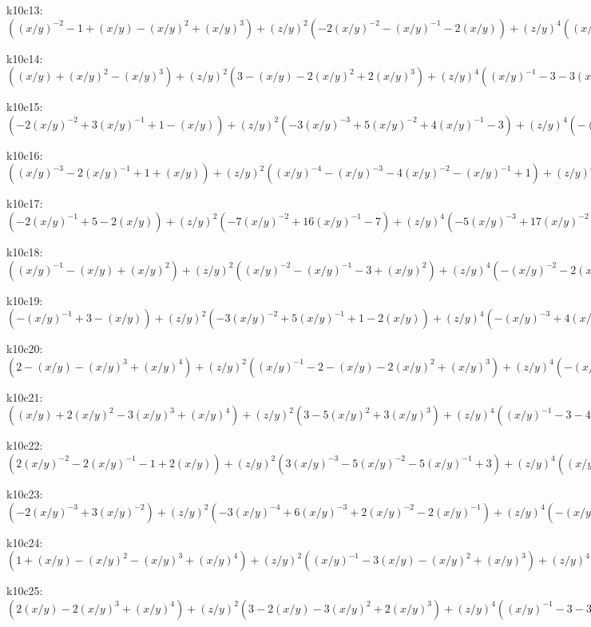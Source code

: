 k10c13: $ ((x/y)^{-2}-1+(x/y)-(x/y)^{2}+(x/y)^{3})  +(z/y)^{2}(-2(x/y)^{-2}-(x/y)^{-1}-2(x/y))  +(z/y)^{4}((x/y)^{-2}+(x/y)^{-1}) $ 

k10c14: $ ((x/y)+(x/y)^{2}-(x/y)^{3})  +(z/y)^{2}(3-(x/y)-2(x/y)^{2}+2(x/y)^{3})  +(z/y)^{4}((x/y)^{-1}-3-3(x/y)+(x/y)^{2})  +(z/y)^{6}(-(x/y)^{-1}-1) $ 

k10c15: $ (-2(x/y)^{-2}+3(x/y)^{-1}+1-(x/y))  +(z/y)^{2}(-3(x/y)^{-3}+5(x/y)^{-2}+4(x/y)^{-1}-3)  +(z/y)^{4}(-(x/y)^{-4}+4(x/y)^{-3}+4(x/y)^{-2}-(x/y)^{-1})  +(z/y)^{6}((x/y)^{-4}+(x/y)^{-3}) $ 

k10c16: $ ((x/y)^{-3}-2(x/y)^{-1}+1+(x/y))  +(z/y)^{2}((x/y)^{-4}-(x/y)^{-3}-4(x/y)^{-2}-(x/y)^{-1}+1)  +(z/y)^{4}(-(x/y)^{-4}-2(x/y)^{-3}-(x/y)^{-2}) $ 

k10c17: $ (-2(x/y)^{-1}+5-2(x/y))  +(z/y)^{2}(-7(x/y)^{-2}+16(x/y)^{-1}-7)  +(z/y)^{4}(-5(x/y)^{-3}+17(x/y)^{-2}-5(x/y)^{-1})  +(z/y)^{6}(-(x/y)^{-4}+7(x/y)^{-3}-(x/y)^{-2})  +(x/y)^{-4}(z/y)^{8} $ 

k10c18: $ ((x/y)^{-1}-(x/y)+(x/y)^{2})  +(z/y)^{2}((x/y)^{-2}-(x/y)^{-1}-3+(x/y)^{2})  +(z/y)^{4}(-(x/y)^{-2}-2(x/y)^{-1}-1) $ 

k10c19: $ (-(x/y)^{-1}+3-(x/y))  +(z/y)^{2}(-3(x/y)^{-2}+5(x/y)^{-1}+1-2(x/y))  +(z/y)^{4}(-(x/y)^{-3}+4(x/y)^{-2}+3(x/y)^{-1}-1)  +(z/y)^{6}((x/y)^{-3}+(x/y)^{-2}) $ 

k10c20: $ (2-(x/y)-(x/y)^{3}+(x/y)^{4})  +(z/y)^{2}((x/y)^{-1}-2-(x/y)-2(x/y)^{2}+(x/y)^{3})  +(z/y)^{4}(-(x/y)^{-1}-1-(x/y)) $ 

k10c21: $ ((x/y)+2(x/y)^{2}-3(x/y)^{3}+(x/y)^{4})  +(z/y)^{2}(3-5(x/y)^{2}+3(x/y)^{3})  +(z/y)^{4}((x/y)^{-1}-3-4(x/y)+(x/y)^{2})  +(z/y)^{6}(-(x/y)^{-1}-1) $ 

k10c22: $ (2(x/y)^{-2}-2(x/y)^{-1}-1+2(x/y))  +(z/y)^{2}(3(x/y)^{-3}-5(x/y)^{-2}-5(x/y)^{-1}+3)  +(z/y)^{4}((x/y)^{-4}-4(x/y)^{-3}-4(x/y)^{-2}+(x/y)^{-1})  +(z/y)^{6}(-(x/y)^{-4}-(x/y)^{-3}) $ 

k10c23: $ (-2(x/y)^{-3}+3(x/y)^{-2})  +(z/y)^{2}(-3(x/y)^{-4}+6(x/y)^{-3}+2(x/y)^{-2}-2(x/y)^{-1})  +(z/y)^{4}(-(x/y)^{-5}+4(x/y)^{-4}+3(x/y)^{-3}-(x/y)^{-2})  +(z/y)^{6}((x/y)^{-5}+(x/y)^{-4}) $ 

k10c24: $ (1+(x/y)-(x/y)^{2}-(x/y)^{3}+(x/y)^{4})  +(z/y)^{2}((x/y)^{-1}-3(x/y)-(x/y)^{2}+(x/y)^{3})  +(z/y)^{4}(-(x/y)^{-1}-2-(x/y)) $ 

k10c25: $ (2(x/y)-2(x/y)^{3}+(x/y)^{4})  +(z/y)^{2}(3-2(x/y)-3(x/y)^{2}+2(x/y)^{3})  +(z/y)^{4}((x/y)^{-1}-3-3(x/y)+(x/y)^{2})  +(z/y)^{6}(-(x/y)^{-1}-1) $ 

